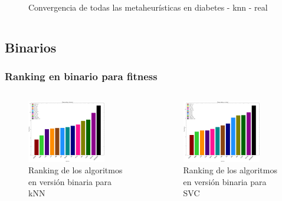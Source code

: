 \begin{frame}
\begin{columns}
\begin{figure}[htp]
            \caption{Convergencia de todas las metaheurísticas en diabetes - knn - real}
        \end{figure}
    \end{columns}
\end{frame}


\subsection{Binarios}
\begin{frame}
    \frametitle{Ranking en binario para fitness}
    \begin{columns}
        \begin{figure}
            \begin{center}
                \includegraphics[width=0.8\textwidth]{imagenes/chapter5/rankings_knn_avg_bin.png}
            \end{center}
            \caption{Ranking de los algoritmos en versión binaria para kNN}
        \end{figure}
        \begin{figure}
            \begin{center}
                \includegraphics[width=0.8\textwidth]{imagenes/chapter5/rankings_svc_avg_bin.png}
            \end{center}
            \caption{Ranking de los algoritmos en versión binaria para SVC}
        \end{figure}
    \end{columns}
\end{frame}

